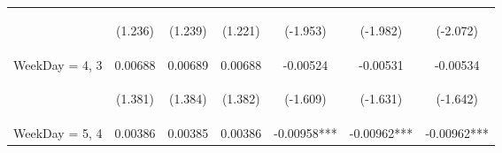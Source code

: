 \documentclass[]{article}
\begin{document}
\begin{center}
\begin{tabular}{lcccccc}
        \vspace{4pt}     & \begin{footnotesize}(1.236)\end{footnotesize}  & \begin{footnotesize}(1.239)\end{footnotesize}  & \begin{footnotesize}(1.221)\end{footnotesize}  & \begin{footnotesize}(-1.953)\end{footnotesize}  & \begin{footnotesize}(-1.982)\end{footnotesize} & \begin{footnotesize}(-2.072)\end{footnotesize} \\
        WeekDay = 4, 3   & 0.00688                                        & 0.00689                                        & 0.00688                                        & -0.00524                                        & -0.00531                                       & -0.00534                                       \\
        \vspace{4pt}     & \begin{footnotesize}(1.381)\end{footnotesize}  & \begin{footnotesize}(1.384)\end{footnotesize}  & \begin{footnotesize}(1.382)\end{footnotesize}  & \begin{footnotesize}(-1.609)\end{footnotesize}  & \begin{footnotesize}(-1.631)\end{footnotesize} & \begin{footnotesize}(-1.642)\end{footnotesize} \\
        WeekDay = 5, 4   & 0.00386                                        & 0.00385                                        & 0.00386                                        & -0.00958***                                     & -0.00962***                                    & -0.00962***                                    \\

\end{tabular}
\end{center}
\end{document}
